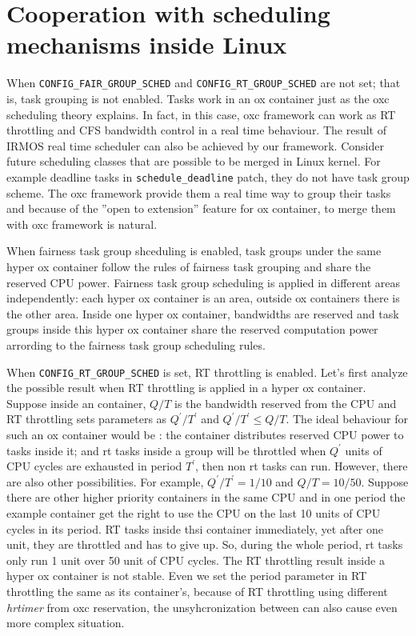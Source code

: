 \section{Cooperation with scheduling mechanisms inside Linux}
When \texttt{CONFIG\_FAIR\_GROUP\_SCHED} and \texttt{CONFIG\_RT\_GROUP\_SCHED}
are not set; that is, task grouping is not enabled. Tasks work in an ox container
just as the oxc scheduling theory explains. In fact, in this case, oxc framework
can work as RT throttling and CFS bandwidth control in a real time behaviour.
The result of IRMOS real time scheduler can also be achieved by our framework.
Consider future scheduling classes that are possible to be merged in Linux kernel.
For example deadline tasks in \texttt{schedule\_deadline} patch, they do not
have task group scheme. The oxc framework provide them a real time way to group
their tasks and because of the ''open to extension'' feature for ox container, to
merge them with oxc framework is natural.

When fairness task group shceduling is enabled, task groups under the same 
hyper ox container follow the rules of fairness task grouping and share the 
reserved CPU power. Fairness task group scheduling is applied in different 
areas independently: each hyper ox container is an area, outside ox containers
there is the other area. Inside one hyper ox container, bandwidths are reserved
and task groups inside this hyper ox container share the reserved computation
power arrording to the fairness task group scheduling rules. 

When \texttt{CONFIG\_RT\_GROUP\_SCHED} is set, RT throttling is enabled.
Let's first analyze the possible result when RT throttling is applied in
a hyper ox container. Suppose inside an container, $Q/T$ is the 
bandwidth reserved from the CPU and RT throttling sets parameters as 
$Q^{'}/T^{'}$ and $Q^{'}/T^{'} \le Q/T$. The ideal behaviour for such an
ox container would be : the container distributes reserved CPU power 
to tasks inside it; and rt tasks inside a group will be throttled when
$Q^{'}$ units of CPU cycles are exhausted in period $T^{'}$, then non
rt tasks can run. However, there are also other possibilities.
For example, $Q^{'}/T^{'} = 1/10$ and $Q/T = 10/50$. Suppose there
are other higher priority containers in the same CPU and in one period 
the example container get the right to use the CPU on the last 10 units
of CPU cycles in its period. RT tasks inside thsi container immediately,
yet after one unit, they are throttled and has to give up. So, during the
whole period, rt tasks only run 1 unit over 50 unit of CPU cycles. The RT
throttling result inside a hyper ox container is not stable. 
Even we set the period parameter in RT throttling the same as its 
container's, because of RT throttling using different \emph{hrtimer} 
from oxc reservation, the unsyhcronization between can also cause even more 
complex situation.

